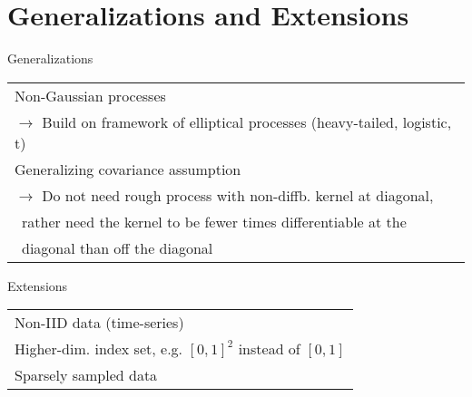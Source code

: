 \section{Generalizations and Extensions}


\begin{frame}{Generalizations}

    \vspace{-1cm}
    \begin{table}[]
    \renewcommand{\arraystretch}{2}
        \begin{tabular}{l}
           Non-Gaussian processes\\
          \quad $\to$ Build on framework of elliptical processes (heavy-tailed,
          logistic, t)\\\pause
           Generalizing covariance assumption\\
          \quad $\to$ Do not need rough process with non-diffb. kernel at
          diagonal,\\[-0.7em]
          \quad\quad\, rather need the kernel to be fewer times differentiable at the\\[-0.7em]
          \quad\quad\, diagonal than off the diagonal
        \end{tabular}
    \end{table}

\end{frame}


\begin{frame}{Extensions}

    \vspace{-1cm}
    \begin{table}[]
    \renewcommand{\arraystretch}{2}
        \begin{tabular}{l}
             Non-IID data (time-series)\\\pause
             Higher-dim. index set, e.g. $[0, 1]^2$ instead of $[0,
            1]$\\\pause
             Sparsely sampled data
        \end{tabular}
    \end{table}

\end{frame}
